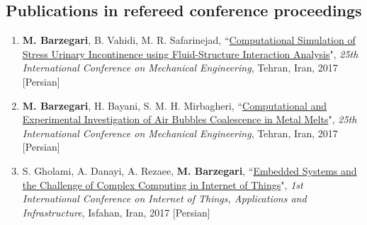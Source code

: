 \documentclass{cv}
\begin{document}
\subsection{Publications in refereed conference proceedings}
\begin{enumerate}
\item
\textbf{M. Barzegari}, B. Vahidi, M. R. Safarinejad, ``\href{https://www.civilica.com/Paper-ISME25-ISME25_342=\%D8\%B4\%D8\%A8\%DB\%8C\%D9\%87-\%D8\%B3\%D8\%A7\%D8\%B2\%DB\%8C-\%D9\%85\%D8\%AD\%D8\%A7\%D8\%B3\%D8\%A8\%D8\%A7\%D8\%AA\%DB\%8C-\%D8\%A8\%DB\%8C-\%D8\%A7\%D8\%AE\%D8\%AA\%DB\%8C\%D8\%A7\%D8\%B1\%DB\%8C-\%D8\%A7\%D8\%B3\%D8\%AA\%D8\%B1\%D8\%B3\%DB\%8C-\%D8\%A7\%D8\%AF\%D8\%B1\%D8\%A7\%D8\%B1-\%D8\%A8\%D8\%A7-\%D8\%A7\%D8\%B3\%D8\%AA\%D9\%81\%D8\%A7\%D8\%AF\%D9\%87-\%D8\%A7\%D8\%B2-\%D8\%B1\%D9\%88\%D8\%B4-\%D8\%AA\%D8\%AD\%D9\%84\%DB\%8C\%D9\%84-\%D8\%A8\%D8\%B1\%D9\%87\%D9\%85\%DA\%A9\%D9\%86\%D8\%B4-\%D8\%B3\%DB\%8C\%D8\%A7\%D9\%84-\%D9\%88-\%D8\%AC\%D8\%A7\%D9\%85\%D8\%AF.html}{Computational Simulation of Stress Urinary Incontinence using Fluid-Structure Interaction Analysis}", \textit{25th International Conference on Mechanical Engineering}, Tehran, Iran, 2017 [Persian]
\item
\textbf{M. Barzegari}, H. Bayani, S. M. H. Mirbagheri, ``\href{https://www.civilica.com/Paper-ISME25-ISME25_710=\%D8\%A8\%D8\%B1\%D8\%B1\%D8\%B3\%DB\%8C-\%D9\%85\%D8\%AD\%D8\%A7\%D8\%B3\%D8\%A8\%D8\%A7\%D8\%AA\%DB\%8C-\%D9\%88-\%D8\%A2\%D8\%B2\%D9\%85\%D8\%A7\%DB\%8C\%D8\%B4\%DA\%AF\%D8\%A7\%D9\%87\%DB\%8C-\%D8\%A7\%D8\%AF\%D8\%BA\%D8\%A7\%D9\%85-\%D8\%AD\%D8\%A8\%D8\%A7\%D8\%A8-\%D9\%87\%D8\%A7\%DB\%8C-\%D9\%87\%D9\%88\%D8\%A7-\%D8\%AF\%D8\%B1-\%D9\%85\%D8\%B0\%D8\%A7\%D8\%A8-\%D9\%81\%D9\%84\%D8\%B2\%DB\%8C.html}{Computational and Experimental Investigation of Air Bubbles Coalescence in Metal Melts}", \textit{25th International Conference on Mechanical Engineering}, Tehran, Iran, 2017 [Persian]
\item
S. Gholami, A. Danayi, A. Rezaee, \textbf{M. Barzegari}, ``\href{https://www.civilica.com/Paper-IOTCONF01-IOTCONF01_014=\%D8\%B3\%DB\%8C\%D8\%B3\%D8\%AA\%D9\%85-\%D9\%86\%D9\%87\%D9\%81\%D8\%AA\%D9\%87-\%D9\%88-\%DA\%86\%D8\%A7\%D9\%84\%D8\%B4-\%D9\%85\%D8\%AD\%D8\%A7\%D8\%B3\%D8\%A8\%D8\%A7\%D8\%AA-\%D9\%BE\%DB\%8C\%DA\%86\%DB\%8C\%D8\%AF\%D9\%87-\%D8\%AF\%D8\%B1-\%D8\%A7\%DB\%8C\%D9\%86\%D8\%AA\%D8\%B1\%D9\%86\%D8\%AA-\%D8\%A7\%D8\%B4\%DB\%8C\%D8\%A7.html}{Embedded Systems and the Challenge of Complex Computing in Internet of Things}", \textit{1st International Conference on Internet of Things, Applications and Infrastructure}, Isfahan, Iran, 2017 [Persian]
\end{enumerate}
\end{document}
